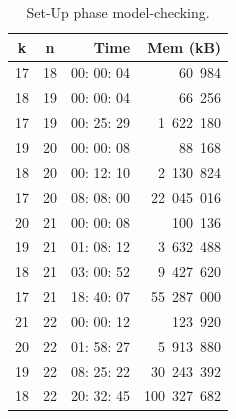 \begin{table}[h]
\centering
{ \centering \begin{tabular}{|c|c|r|r|}
\hline \textbf{k} & \textbf{n} & \textbf{Time} &\textbf{Mem (kB)} \\ \hline 
17 & 18 & 00: 00: 04 & 60\, 984 \\ \hline
18 & 19 & 00: 00: 04 & 66\, 256 \\ \hline 
17 & 19 & 00: 25: 29 & 1\, 622\, 180 \\ \hline 
19 & 20 & 00: 00: 08 & 88\, 168 \\ \hline 
18 & 20 & 00: 12: 10 &2\, 130\, 824 \\ \hline 
17& 20  & 08: 08: 00 & 22\, 045\, 016 \\ \hline 
20 & 21 & 00: 00: 08 & 100\, 136 \\\hline 
19 & 21 & 01: 08: 12 & 3\, 632\, 488 \\ \hline
18 & 21 & 03: 00: 52 & 9\, 427\, 620 \\ \hline 
17 & 21 & 18: 40: 07 &55\, 287\, 000 \\ \hline 
21 & 22 & 00: 00: 12 & 123\, 920 \\ \hline 
20 & 22 &01: 58: 27 & 5\, 913\, 880 \\ \hline 
19 & 22 & 08: 25: 22 & 30\, 243\, 392 \\ \hline
18 & 22 & 20: 32: 45 & 100\, 327\, 682 \\ 
\hline 
\end{tabular}}
\caption{Set-Up phase model-checking.} 
\label{tab: flo2}
\end{table}

